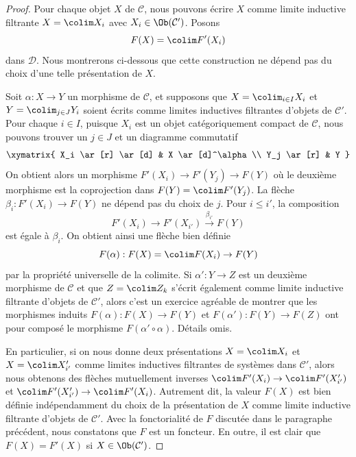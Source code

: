 \begin{proof}
Pour chaque objet $X$ de $\mathcal{C}$, nous pouvons écrire $X$ comme limite
inductive filtrante $X = \colim X_i$ avec $X_i \in \Ob(\mathcal{C}')$. Posons
$$
F(X) = \colim F'(X_i)
$$
dans $\mathcal{D}$. Nous montrerons ci-dessous que cette construction ne
dépend pas du choix d'une telle présentation de $X$.

\medskip\noindent
Soit $\alpha : X \to Y$ un morphisme de $\mathcal{C}$, et supposons que $X = \colim_{i \in I} X_i$ et $Y = \colim_{j \in J} Y_i$ soient écrits comme
limites inductives filtrantes d'objets de $\mathcal{C}'$. Pour chaque $i \in I$, puisque
$X_i$ est un objet catégoriquement compact de $\mathcal{C}$, nous pouvons
trouver un $j \in J$ et un diagramme commutatif
$$
\xymatrix{
X_i \ar[r] \ar[d] & X \ar[d]^\alpha \\
Y_j \ar[r] & Y
}
$$
On obtient alors un morphisme $F'(X_i) \to F'(Y_j) \to F(Y)$ où le deuxième
morphisme est la coprojection dans $F(Y) = \colim F'(Y_j)$. La flèche $\beta_i : F'(X_i) \to F(Y)$ ne dépend pas du choix de $j$. Pour $i \leq i'$, la
composition
$$
F'(X_i) \to F'(X_{i'}) \xrightarrow{\beta_{i'}} F(Y)
$$
est égale à $\beta_i$. On obtient ainsi une flèche bien définie
$$
F(\alpha) : F(X) = \colim F(X_i) \to F(Y)
$$
par la propriété universelle de la colimite. Si $\alpha' : Y \to Z$ est un
deuxième morphisme de $\mathcal{C}$ et que $Z = \colim Z_k$ s'écrit également
comme limite inductive filtrante d'objets de $\mathcal{C}'$, alors c'est un exercice
agréable de montrer que les morphismes induits $F(\alpha) : F(X) \to F(Y)$ et
$F(\alpha') : F(Y) \to F(Z)$ ont pour composé le morphisme $F(\alpha' \circ \alpha)$.
Détails omis.

\medskip\noindent
En particulier, si on nous donne deux présentations $X = \colim X_i$ et $X = \colim X'_{i'}$ comme limites inductives filtrantes de systèmes dans $\mathcal{C}'$,
alors nous obtenons des flèches mutuellement inverses $\colim F'(X_i) \to \colim F'(X'_{i'})$ et $\colim F'(X'_{i'}) \to \colim F'(X_i)$. Autrement dit,
la valeur $F(X)$ est bien définie indépendamment du choix de la présentation
de $X$ comme limite inductive filtrante d'objets de $\mathcal{C}'$. Avec la
fonctorialité de $F$ discutée dans le paragraphe précédent, nous constatons
que $F$ est un foncteur. En outre, il est clair que $F(X) = F'(X)$ si $X \in \Ob(\mathcal{C}')$.


\end{proof}
